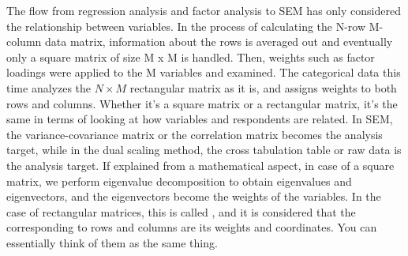 \documentclass{ltjsbook}
\begin{document}
The flow from regression analysis and factor analysis to SEM has only considered the relationship between variables. In the process of calculating the N-row M-column data matrix, information about the rows is averaged out and eventually only a square matrix of size M x M is handled. Then, weights such as factor loadings were applied to the M variables and examined.
The categorical data this time analyzes the $N\times M$ rectangular matrix as it is, and assigns weights to both rows and columns. Whether it's a square matrix or a rectangular matrix, it's the same in terms of looking at how variables and respondents are related. In SEM, the variance-covariance matrix or the correlation matrix becomes the analysis target, while in the dual scaling method, the cross tabulation table or raw data is the analysis target. If explained from a mathematical aspect, in case of a square matrix, we perform eigenvalue decomposition to obtain eigenvalues and eigenvectors, and the eigenvectors become the weights of the variables.
In the case of rectangular matrices, this is called , and it is considered that the  corresponding to rows and columns are its weights and coordinates. You can essentially think of them as the same thing.

\end{document}
